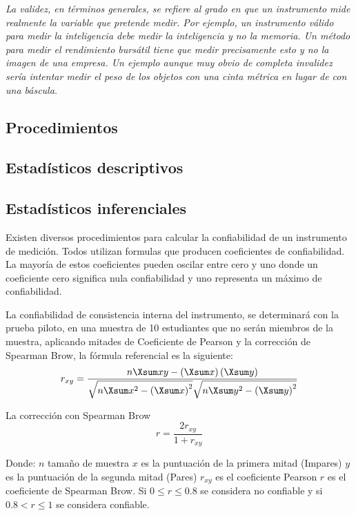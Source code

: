 \documentclass[12pt,a4paper]{article}
\begin{document}
\begin{adjustwidth}{1cm}{}
\emph{La validez, en términos generales, se refiere al grado en que un instrumento mide
realmente la variable que pretende medir. Por ejemplo, un instrumento válido para medir la inteligencia debe medir la inteligencia y no la memoria. Un método para medir
el rendimiento bursátil tiene que medir precisamente esto y no la imagen de una empresa. Un ejemplo aunque muy obvio de completa invalidez sería intentar medir el peso de los objetos con una cinta métrica en lugar de con una báscula.} \cite[p.~200]{inv1}
\end{adjustwidth}

\subsection{Procedimientos}
\subsection{Estadísticos descriptivos}
\subsection{Estadísticos inferenciales}

Existen  diversos procedimientos para calcular la confiabilidad de un instrumento de medición. Todos utilizan formulas que producen coeficientes de confiabilidad. La mayoría de estos coeficientes pueden oscilar entre cero y uno donde un coeficiente cero significa nula confiabilidad y uno representa  un máximo de confiabilidad.

La confiabilidad de consistencia interna del instrumento, se determinará con la prueba piloto, en una muestra de 10 estudiantes que no serán miembros de la muestra, aplicando mitades de Coeficiente de Pearson y la corrección de Spearman Brow, la fórmula referencial es la siguiente: $$r_{xy}=\frac{n\Xsum xy-\cc{\Xsum x}\cc{\Xsum y}}{\sqrt{n\Xsum x^2-\cc{\Xsum x}^2}\sqrt{n\Xsum y^2-\cc{\Xsum y}^2}}$$

La corrección con Spearman Brow $$r=\frac{2r_{xy}}{1+r_{xy}}$$

	Donde:
$n$ tamaño de muestra
$x$ es la puntuación de la primera mitad (Impares)
$y$ es la puntuación de la segunda mitad (Pares)
$r_{xy}$ es el coeficiente Pearson
$r$ es el coeficiente de Spearman Brow. Si $0\leq r\leq 0.8$ se considera no confiable y si $0.8< r \leq1$ se considera confiable.
\end{document}
